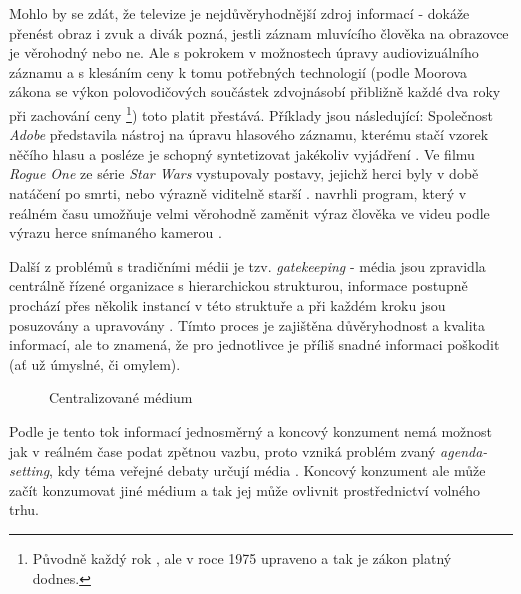 \documentclass[12pt,a4paper]{report}
\begin{document}
Mohlo by se zdát, že televize je nejdůvěryhodnější zdroj informací - dokáže přenést obraz i zvuk a divák pozná, jestli záznam mluvícího člověka na obrazovce je věrohodný nebo ne. Ale s pokrokem v možnostech úpravy audiovizuálního záznamu a s klesáním ceny k tomu potřebných technologií (podle Moorova zákona se výkon polovodičových součástek zdvojnásobí přibližně každé dva roky při zachování ceny \citep{moore04}\footnote{Původně každý rok \citep{moore65}, ale v roce 1975 upraveno a tak je zákon platný dodnes.}) toto platit přestává. Příklady jsou následující: Společnost \textit{Adobe} představila nástroj na úpravu hlasového záznamu, kterému stačí vzorek něčího hlasu a posléze je schopný syntetizovat jakékoliv vyjádření \citep{anthony16}. Ve filmu \textit{Rogue One} ze série \textit{Star Wars} vystupovaly postavy, jejichž herci byly v době natáčení po smrti, nebo výrazně viditelně starší \citep{cooper17}. \citeauthor{thies16} navrhli program, který v reálném času umožňuje velmi věrohodně zaměnit výraz člověka ve videu podle výrazu herce snímaného kamerou \citep{thies16}.

Další z problémů s tradičními médii je tzv. \textit{gatekeeping} - média jsou zpravidla centrálně řízené organizace s hierarchickou strukturou, informace postupně prochází přes několik instancí v této struktuře a při každém kroku jsou posuzovány a upravovány \citep{dragoni13}. Tímto proces je zajištěna důvěryhodnost a kvalita informací, ale to znamená, že pro jednotlivce je příliš snadné informaci poškodit (ať už úmyslné, či omylem).

\begin{figure}
\centering
{}
\caption{Centralizované médium}
\end{figure}

Podle \citeauthor{dragoni13} je tento tok informací jednosměrný a koncový konzument nemá možnost jak v reálném čase podat zpětnou vazbu, proto vzniká problém zvaný \textit{agenda-setting}, kdy téma veřejné debaty určují média \citep{dragoni13}. Koncový konzument ale může začít konzumovat jiné médium a tak jej může ovlivnit prostřednictví volného trhu.
\end{document}
